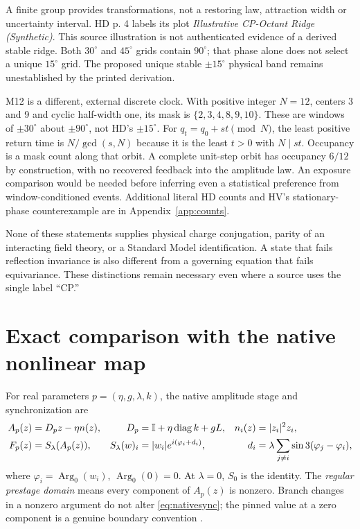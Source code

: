 \documentclass[11pt,a4paper]{article}
\numberwithin{equation}{section}
\newcommand{\I}{\mathbb I}\newcommand{\Argz}{\operatorname{Arg}_0}
\begin{document}
A finite group provides transformations, not a restoring law, attraction width or uncertainty interval. HD p. 4 labels its plot \emph{Illustrative CP-Octant Ridge (Synthetic)}. This source illustration is not authenticated evidence of a derived stable ridge. Both $30^\circ$ and $45^\circ$ grids contain $90^\circ$; that phase alone does not select a unique $15^\circ$ grid. The proposed unique stable $\pm15^\circ$ physical band remains unestablished by the printed derivation.

M12 is a different, external discrete clock. With positive integer $N=12$, centers 3 and 9 and cyclic half-width one, its mask is $\{2,3,4,8,9,10\}$. These are windows of $\pm30^\circ$ about $\pm90^\circ$, not HD's $\pm15^\circ$. For $q_t=q_0+st\pmod N$, the least positive return time is $N/\gcd(s,N)$ because it is the least $t>0$ with $N\mid st$. Occupancy is a mask count along that orbit. A complete unit-step orbit has occupancy $6/12$ by construction, with no recovered feedback into the amplitude law. An exposure comparison would be needed before inferring even a statistical preference from window-conditioned events. Additional literal HD counts and HV's stationary-phase counterexample are in Appendix~\ref{app:counts}.

None of these statements supplies physical charge conjugation, parity of an interacting field theory, or a Standard Model identification. A state that fails reflection invariance is also different from a governing equation that fails equivariance. These distinctions remain necessary even where a source uses the single label ``CP.''

\section{Exact comparison with the native nonlinear map}\label{sec:native}
For real parameters $p=(\eta,g,\lambda,k)$, the native amplitude stage and synchronization are
\begin{align}
 A_p(z)&=D_pz-\eta n(z),& D_p&=\I+\eta\diag k+gL,& n_i(z)&=|z_i|^2z_i,\label{eq:nativeamp}\\
 F_p(z)&=S_\lambda(A_p(z)),& S_\lambda(w)_i&=|w_i|e^{i(\varphi_i+d_i)},&
 d_i&=\lambda\sum_{j\ne i}\sin3(\varphi_j-\varphi_i),\label{eq:nativesync}
\end{align}
where $\varphi_i=\Argz(w_i)$, $\Argz(0)=0$. At $\lambda=0$, $S_0$ is the identity. The \emph{regular prestage domain} means every component of $A_p(z)$ is nonzero. Branch changes in a nonzero argument do not alter \eqref{eq:nativesync}; the pinned value at a zero component is a genuine boundary convention \cite{pa}.
\end{document}
